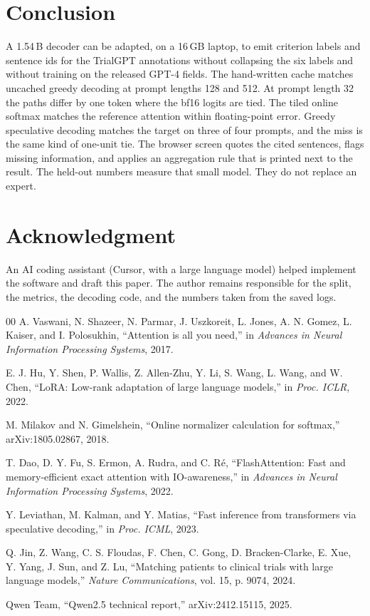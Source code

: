 \documentclass[conference]{IEEEtran}
\begin{document}
\section{Conclusion}
A 1.54\,B decoder can be adapted, on a 16\,GB laptop, to emit criterion labels and sentence ids for the TrialGPT annotations without collapsing the six labels and without training on the released GPT-4 fields.
The hand-written cache matches uncached greedy decoding at prompt lengths 128 and 512. At prompt length 32 the paths differ by one token where the bf16 logits are tied. The tiled online softmax matches the reference attention within floating-point error. Greedy speculative decoding matches the target on three of four prompts, and the miss is the same kind of one-unit tie.
The browser screen quotes the cited sentences, flags missing information, and applies an aggregation rule that is printed next to the result.
The held-out numbers measure that small model. They do not replace an expert.

\section*{Acknowledgment}
An AI coding assistant (Cursor, with a large language model) helped implement the software and draft this paper.
The author remains responsible for the split, the metrics, the decoding code, and the numbers taken from the saved logs.

\begin{thebibliography}{00}
A. Vaswani, N. Shazeer, N. Parmar, J. Uszkoreit, L. Jones, A. N. Gomez, L. Kaiser, and I. Polosukhin,
``Attention is all you need,'' in \emph{Advances in Neural Information Processing Systems}, 2017.

E. J. Hu, Y. Shen, P. Wallis, Z. Allen-Zhu, Y. Li, S. Wang, L. Wang, and W. Chen,
``LoRA: Low-rank adaptation of large language models,'' in \emph{Proc. ICLR}, 2022.

M. Milakov and N. Gimelshein,
``Online normalizer calculation for softmax,'' arXiv:1805.02867, 2018.

T. Dao, D. Y. Fu, S. Ermon, A. Rudra, and C. R\'e,
``FlashAttention: Fast and memory-efficient exact attention with IO-awareness,'' in \emph{Advances in Neural Information Processing Systems}, 2022.

Y. Leviathan, M. Kalman, and Y. Matias,
``Fast inference from transformers via speculative decoding,'' in \emph{Proc. ICML}, 2023.

Q. Jin, Z. Wang, C. S. Floudas, F. Chen, C. Gong, D. Bracken-Clarke, E. Xue, Y. Yang, J. Sun, and Z. Lu,
``Matching patients to clinical trials with large language models,'' \emph{Nature Communications}, vol. 15, p. 9074, 2024.

Qwen Team,
``Qwen2.5 technical report,'' arXiv:2412.15115, 2025.
\end{thebibliography}
\end{document}
